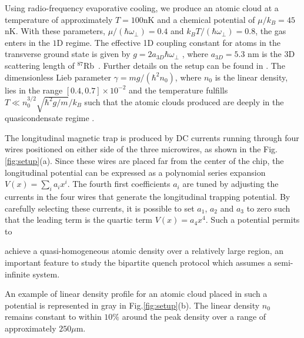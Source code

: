 Using radio-frequency evaporative cooling, we produce an atomic cloud at a temperature of approximately $T=100$nK and a chemical potential of $\mu/ k_B = 45$nK. With these parameters, $\mu/ (\hbar \omega_{\perp})=0.4$ and $k_B T/ (\hbar \omega_{\perp} )=0.8$, the gas enters in the $1$D regime. The effective 1D coupling constant for atoms in the transverse ground state is given by $g = 2 a_{3D} \hbar \omega_{\perp}$ \cite{PhysRevLett.81.938}, where $a_{3D}=5.3$ nm is the $3$D scattering length of $^{87}$Rb~\cite{PhysRevLett.89.283202}. Further details on the setup can be found in \cite{duboistel-04749900}. 
The dimensionless Lieb parameter $\gamma =  mg / (\hbar^2 n_0)$, where $n_0$ is the linear density, lies in the range $ [0.4,0.7] \times 10^{-2}$ and the  temperature fulfills 
$ T \ll n_0^{3/2} \sqrt{\hbar^2 g /m}/k_B$ such that the atomic clouds produced are deeply in the quasicondensate regime%
\cite{PhysRevLett.91.040403}.




The longitudinal magnetic trap is produced by DC currents
running through four wires positioned on either side of the three microwires, as shown in the Fig.\ref{fig:setup}(a). Since these wires are placed far from the center of the chip, the longitudinal potential can be expressed as a polynomial series expansion $V(x)= \sum_{i} a_i x^i$. 
The fourth first coefficients $a_i$ are tuned by adjusting the currents in the four wires that generate the longitudinal trapping potential. By carefully selecting these currents, it is possible to set $a_1$, $a_2$ and $a_3$ to zero such that 
the leading term is  the quartic term $V(x)=a_4 x^4$. Such a potential permits to 

achieve a quasi-homogeneous atomic density over a relatively large region, an 
important feature to study the bipartite quench protocol which assumes 
a semi-infinite system.

An example of linear density profile for an atomic cloud placed in such a potential is represented in gray in Fig.\ref{fig:setup}(b). The linear density $n_0$ remains constant to within $10 \%$ around the peak density over a range of approximately $250 \mu$m. 



